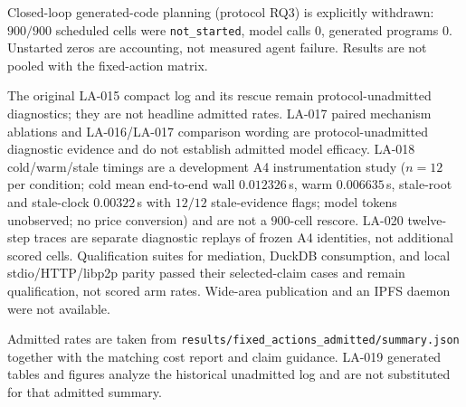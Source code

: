 Closed-loop generated-code planning (protocol RQ3) is explicitly withdrawn: $900/900$ scheduled cells were \texttt{not\_started}, model calls $0$, generated programs $0$. Unstarted zeros are accounting, not measured agent failure. Results are not pooled with the fixed-action matrix.

The original LA-015 compact log and its rescue remain protocol-unadmitted diagnostics; they are not headline admitted rates. LA-017 paired mechanism ablations and LA-016/LA-017 comparison wording are protocol-unadmitted diagnostic evidence and do not establish admitted model efficacy. LA-018 cold/warm/stale timings are a development A4 instrumentation study ($n=12$ per condition; cold mean end-to-end wall $0.012326$\,s, warm $0.006635$\,s, stale-root and stale-clock $0.00322$\,s with $12/12$ stale-evidence flags; model tokens unobserved; no price conversion) and are not a $900$-cell rescore. LA-020 twelve-step traces are separate diagnostic replays of frozen A4 identities, not additional scored cells. Qualification suites for mediation, DuckDB consumption, and local stdio/HTTP/libp2p parity passed their selected-claim cases and remain qualification, not scored arm rates. Wide-area publication and an IPFS daemon were not available.

Admitted rates are taken from \texttt{results/fixed\_actions\_admitted/summary.json} together with the matching cost report and claim guidance. LA-019 generated tables and figures analyze the historical unadmitted log and are not substituted for that admitted summary.
